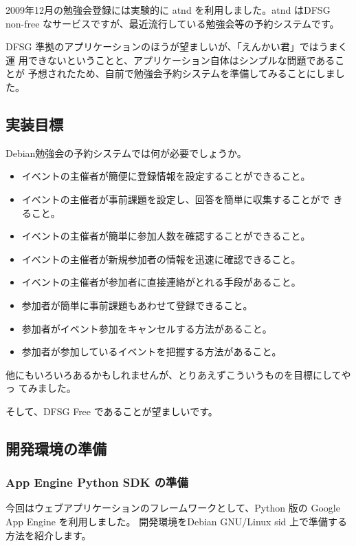 \documentclass[mingoth,a4paper]{jsarticle}
\begin{document}
2009年12月の勉強会登録には実験的に atnd を利用しました。atnd はDFSG
non-free なサービスですが、最近流行している勉強会等の予約システムです。

DFSG 準拠のアプリケーションのほうが望ましいが、「えんかい君」ではうまく運
用できないということと、アプリケーション自体はシンプルな問題であることが
予想されたため、自前で勉強会予約システムを準備してみることにしました。

\subsection{実装目標}

Debian勉強会の予約システムでは何が必要でしょうか。

\begin{itemize}
 \item イベントの主催者が簡便に登録情報を設定することができること。
 \item イベントの主催者が事前課題を設定し、回答を簡単に収集することがで
       きること。
 \item イベントの主催者が簡単に参加人数を確認することができること。
 \item イベントの主催者が新規参加者の情報を迅速に確認できること。
 \item イベントの主催者が参加者に直接連絡がとれる手段があること。
 \item 参加者が簡単に事前課題もあわせて登録できること。
 \item 参加者がイベント参加をキャンセルする方法があること。
 \item 参加者が参加しているイベントを把握する方法があること。
\end{itemize}

他にもいろいろあるかもしれませんが、とりあえずこういうものを目標にしてやっ
てみました。

そして、DFSG Free であることが望ましいです。

\subsection{開発環境の準備}

\subsubsection{App Engine Python SDK の準備}

今回はウェブアプリケーションのフレームワークとして、Python 版の Google
App Engine を利用しました。
開発環境をDebian GNU/Linux sid 上で準備する方法を紹介します。
\end{document}
